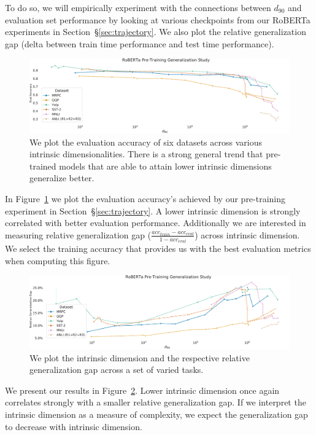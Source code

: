 \documentclass{article} %
\begin{document}
To do so, we will empirically experiment with the connections between $d_{90}$ and evaluation set performance by looking at various checkpoints from our RoBERTa experiments in Section~\S\ref{sec:trajectory}. We also plot the relative generalization gap (delta between train time performance and test time performance).


\begin{figure}
    \centering
    \includegraphics[width=1.0\textwidth]{figures/roberta_gen_eval_acc.pdf}
    \caption{We plot the evaluation accuracy of six datasets across various intrinsic dimensionalities. There is a strong general trend that pre-trained models that are able to attain lower intrinsic dimensions generalize better.}
    \label{fig:roberta_gen_eval_acc}
\end{figure}

In Figure~\ref{fig:roberta_gen_eval_acc} we plot the evaluation accuracy's achieved by our pre-training experiment in Section~\S\ref{sec:trajectory}. A lower intrinsic dimension is strongly correlated with better evaluation performance. Additionally we are interested in measuring relative generalization gap ($\frac{acc_{train}-acc_{eval}}{1-acc_{eval}}$) across intrinsic dimension. We select the training accuracy that provides us with the best evaluation metrics when computing this figure. 
\begin{figure}
    \centering
    \includegraphics[width=1.0\textwidth]{figures/roberta_gen_rel_gap.pdf}
    \caption{We plot the intrinsic dimension and the respective relative generalization gap across a set of varied tasks.}
    \label{fig:roberta_gen_rel_gap}
\end{figure}

We present our results in Figure~\ref{fig:roberta_gen_rel_gap}. Lower intrinsic dimension once again correlates strongly with a smaller relative generalization gap. If we interpret the intrinsic dimension as a measure of complexity, we expect the generalization gap to decrease with intrinsic dimension.
\end{document}
